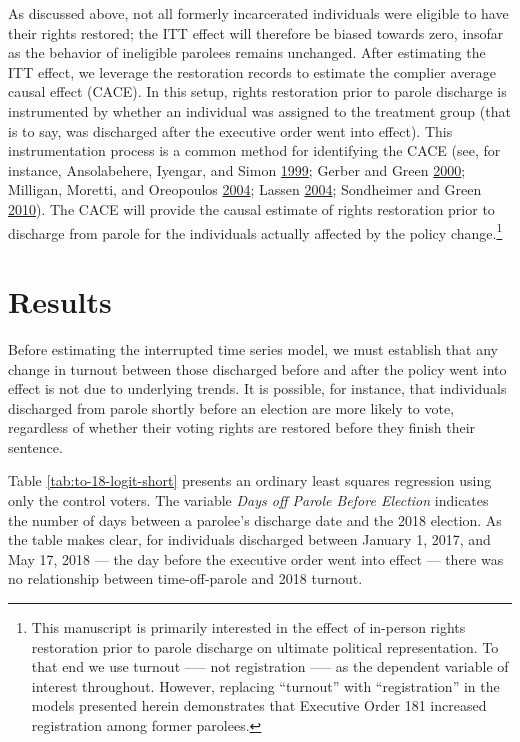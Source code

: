\documentclass[
  12pt,
]{article}
\begin{document}
As discussed above, not all formerly incarcerated individuals were eligible to have their rights restored; the ITT effect will therefore be biased towards zero, insofar as the behavior of ineligible parolees remains unchanged. After estimating the ITT effect, we leverage the restoration records to estimate the complier average causal effect (CACE). In this setup, rights restoration prior to parole discharge is instrumented by whether an individual was assigned to the treatment group (that is to say, was discharged after the executive order went into effect). This instrumentation process is a common method for identifying the CACE (see, for instance, Ansolabehere, Iyengar, and Simon \protect\hyperlink{ref-Ansolabehere1999}{1999}; Gerber and Green \protect\hyperlink{ref-Gerber2000}{2000}; Milligan, Moretti, and Oreopoulos \protect\hyperlink{ref-Milligan2004}{2004}; Lassen \protect\hyperlink{ref-Lassen2004}{2004}; Sondheimer and Green \protect\hyperlink{ref-Sondheimer2010}{2010}). The CACE will provide the causal estimate of rights restoration prior to discharge from parole for the individuals actually affected by the policy change.\footnote{This manuscript is primarily interested in the effect of in-person rights restoration prior to parole discharge on ultimate political representation. To that end we use turnout ----- not registration ----- as the dependent variable of interest throughout. However, replacing ``turnout'' with ``registration'' in the models presented herein demonstrates that Executive Order 181 increased registration among former parolees.}

\hypertarget{results}{%
\section*{Results}\label{results}}

Before estimating the interrupted time series model, we must establish that any change in turnout between those discharged before and after the policy went into effect is not due to underlying trends. It is possible, for instance, that individuals discharged from parole shortly before an election are more likely to vote, regardless of whether their voting rights are restored before they finish their sentence.

Table \ref{tab:to-18-logit-short} presents an ordinary least squares regression using only the control voters. The variable \emph{Days off Parole Before Election} indicates the number of days between a parolee's discharge date and the 2018 election. As the table makes clear, for individuals discharged between January 1, 2017, and May 17, 2018 --- the day before the executive order went into effect --- there was no relationship between time-off-parole and 2018 turnout.
\end{document}

